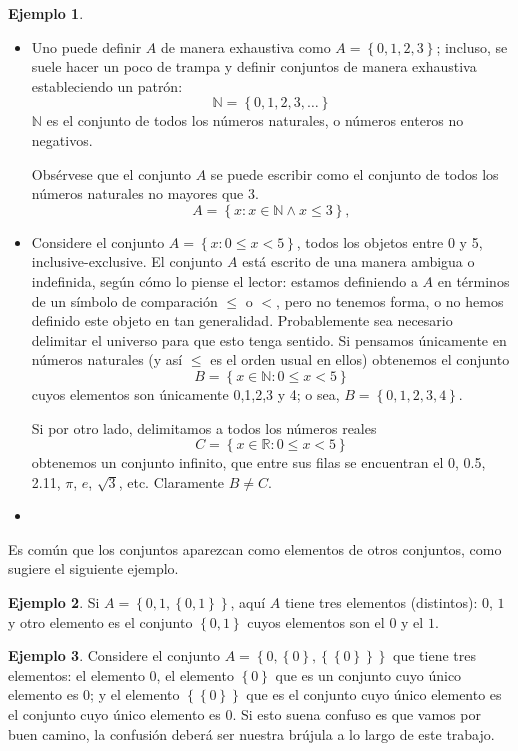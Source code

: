 \documentclass{book}
\newcommand{\set}[1]{\left\lbrace #1 \right\rbrace }
\theoremstyle{definition}
\newtheorem*{ejm}{Ejemplo}
\begin{document}
\begin{ejm}	\begin{itemize}
	\item Uno puede definir $A$ de manera exhaustiva como $A=\set{0,1,2,3}$; incluso, se suele hacer un poco de trampa y definir conjuntos de manera exhaustiva estableciendo un patrón:
	\[\mathbb{N} = \set{0,1,2,3,\ldots}\]
	$\mathbb{N}$ es el conjunto de todos los números naturales, o números enteros no negativos.
	
	Obsérvese que el conjunto $A$ se puede escribir como el conjunto de todos los números naturales no mayores que 3.
	\[A = \set{x : x \in \mathbb{N} \wedge x \leq 3},\]
	
	\item Considere el conjunto $A=\set{x : 0\leq x < 5}$, todos los objetos entre 0 y 5, inclusive-exclusive. El conjunto $A$ está escrito de una manera ambigua o indefinida, según cómo lo piense el lector: estamos definiendo a $A$ en términos de un símbolo de comparación $\leq$ o $<$, pero no tenemos forma, o no hemos definido este objeto en tan generalidad. Probablemente sea necesario delimitar el universo para que esto tenga sentido. 
	Si pensamos únicamente en números naturales (y así $\leq$ es el orden usual en ellos) obtenemos el conjunto
	\[B = \set{x \in \mathbb{N}: 0\leq x < 5}\]
	cuyos elementos son únicamente 0,1,2,3 y 4; o sea, $B = \set{0,1,2,3,4}$.
	
	Si por otro lado, delimitamos a todos los números reales
	\[C = \set{x \in \mathbb{R}: 0\leq x < 5}\]
	obtenemos un conjunto infinito, que entre sus filas se encuentran el 0, 0.5, 2.11, $\pi$, $e$, $\sqrt{3}$, etc.
	Claramente $B \neq C$.
	
	\item %
\end{itemize}\end{ejm}

Es común que los conjuntos aparezcan como elementos de otros conjuntos, como sugiere el siguiente ejemplo.
\begin{ejm}
	Si $A = \set{0,1, \set{0,1}}$, aquí $A$ tiene tres elementos (distintos): $0$, $1$ y otro elemento es el conjunto $\set{0,1}$ cuyos elementos son el $0$ y el $1$.
\end{ejm}

\begin{ejm}
	Considere el conjunto $A= \set{0,\set{0}, \set{\set{0}}}$ que tiene tres elementos: el elemento $0$, el elemento $\set{0}$ que es un conjunto cuyo único elemento es $0$; y el elemento $\set{\set{0}}$ que es el conjunto cuyo único elemento es el conjunto cuyo único elemento es $0$.
	Si esto suena confuso es que vamos por buen camino, la confusión deberá ser nuestra brújula a lo largo de este trabajo.
\end{ejm}
\end{document}
